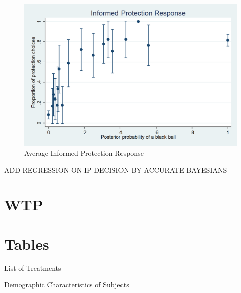 \documentclass[11pt,a4paper]{article}
\begin{document}
\begin{figure}[H]
\centering
\caption{Average Informed Protection Response} \label{Informed Protection Responses}

  \centering
  \includegraphics[scale=0.3]{Graphs/ip_response.png}

\end{figure}


\clearpage




ADD REGRESSION ON IP DECISION BY ACCURATE BAYESIANS

\newpage



\newpage\clearpage
\section{WTP}


\newpage
\section{Tables}


\begin{table}[htbp!]
\caption{List of Treatments}

\end{table}

\begin{table}[htbp!]
\caption{Demographic Characteristics of Subjects}

\end{table}
\end{document}
